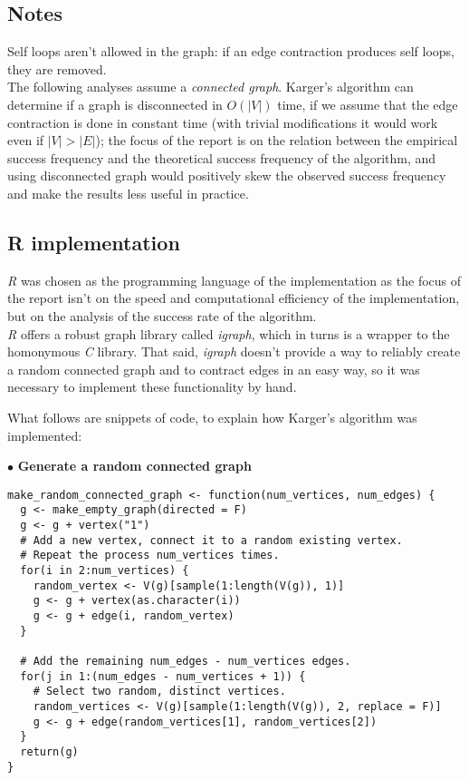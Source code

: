 \documentclass[
12pt,
a4paper,
oneside,
headinclude,
footinclude]{article}
\begin{document}
\subsection{Notes}
\vspace{-5mm}
Self loops aren't allowed in the graph: if an edge contraction produces self loops, they are removed. \\
The following analyses assume a \textit{connected graph}. Karger's algorithm can determine if a graph is disconnected in $O(|V|)$ time, 
if we assume that the edge contraction is done in constant time (with trivial modifications it would work even if $|V| > |E|$);
the focus of the report is on the relation between the empirical success frequency and the theoretical success frequency of the algorithm,
and using disconnected graph would positively skew the observed success frequency and make the results less useful in practice. 

\subsection{R implementation}
\vspace{-5mm}
\textit{R} was chosen as the programming language of the implementation as the focus of the report isn't on the speed and computational efficiency of the implementation,
but on the analysis of the success rate of the algorithm. \\
\textit{R} offers a robust graph library called \textit{igraph}, which in turns is a wrapper to the homonymous \textit{C} library.
That said, \textit{igraph} doesn't provide a way to reliably create a random connected graph and to contract edges in an easy way,
so it was necessary to implement these functionality by hand.


What follows are snippets of code, to explain how Karger's algorithm was implemented:


$\bullet$ \textbf{Generate a random connected graph}

\begin{lstlisting}
make_random_connected_graph <- function(num_vertices, num_edges) {
  g <- make_empty_graph(directed = F)
  g <- g + vertex("1")
  # Add a new vertex, connect it to a random existing vertex.
  # Repeat the process num_vertices times.
  for(i in 2:num_vertices) {
    random_vertex <- V(g)[sample(1:length(V(g)), 1)]
    g <- g + vertex(as.character(i))
    g <- g + edge(i, random_vertex)
  }

  # Add the remaining num_edges - num_vertices edges.
  for(j in 1:(num_edges - num_vertices + 1)) {
    # Select two random, distinct vertices.
    random_vertices <- V(g)[sample(1:length(V(g)), 2, replace = F)]
    g <- g + edge(random_vertices[1], random_vertices[2])
  }
  return(g)
}
\end{lstlisting}
\end{document}
